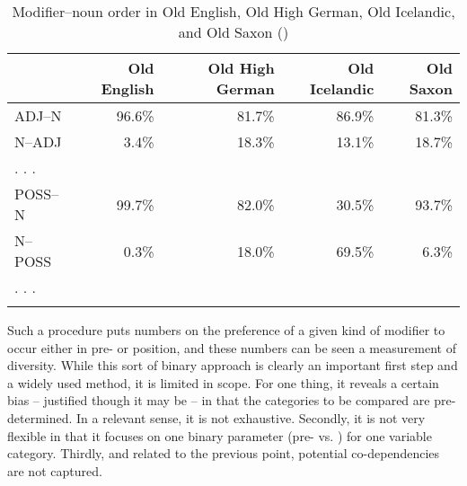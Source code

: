 \documentclass[output=paper,colorlinks,citecolor=brown,draft]{langscibook}
\begin{document}
\begin{table}
\caption{Modifier–noun order in Old English, Old High German, Old Icelandic, and Old Saxon ()}
\label{tab:pilot}
 \begin{tabularx}{\textwidth}{Xrrrr}
  \lsptoprule
  & {Old English} & {Old High German} & {Old Icelandic} & {Old Saxon}\\
  \midrule
  ADJ--N  & 96.6\%  & 81.7\%  & 86.9\%  & 81.3\%\\
  N--ADJ  & 3.4\%  & 18.3\%  & 13.1\%  & 18.7\%\\
  . . . &  &   &   &    \\
  POSS--N & 99.7\%  & 82.0\%  & 30.5\%  & 93.7\%\\
  N--POSS  & 0.3\%  & 18.0\%  & 69.5\%  & 6.3\%\\
 . . . &   &  &   &  \\
  \lspbottomrule
 \end{tabularx}
\end{table}

Such a procedure puts numbers on the preference of a given kind of modifier to occur either in pre- or  position, and these numbers can be seen a measurement of diversity. While this sort of binary approach is clearly an important first step and a widely used method, it is limited in scope. For one thing, it reveals a certain bias -- justified though it may be -- in that the categories to be compared are pre-determined. In a relevant sense, it is not exhaustive. Secondly, it is not very flexible in that it focuses on one binary parameter (pre- vs. ) for one variable category.  Thirdly, and related to the previous point, potential co-dependencies are not captured.
\end{document}
